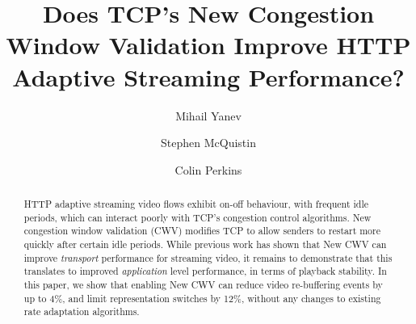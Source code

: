 \documentclass[10pt,sigconf,anonymous]{acmart}
\begin{document}
\title{Does TCP's New Congestion Window Validation Improve HTTP Adaptive Streaming Performance?}

\author{Mihail Yanev}


\author{Stephen McQuistin}
    \email{}

\author{Colin Perkins}



\begin{abstract}

HTTP adaptive streaming video flows exhibit on-off behaviour, with frequent idle periods, which can interact poorly with TCP's congestion control algorithms. New congestion window validation (CWV) modifies TCP to allow senders to restart more quickly after certain idle periods. While previous work has shown that New CWV can improve \emph{transport} performance for streaming video, it remains to demonstrate that this translates to improved \emph{application} level performance, in terms of playback stability. In this paper, we show that enabling New CWV can reduce video re-buffering events by up to 4\%, and limit representation switches by 12\%, without any changes to existing rate adaptation algorithms.

\end{abstract}
\maketitle
\end{document}
